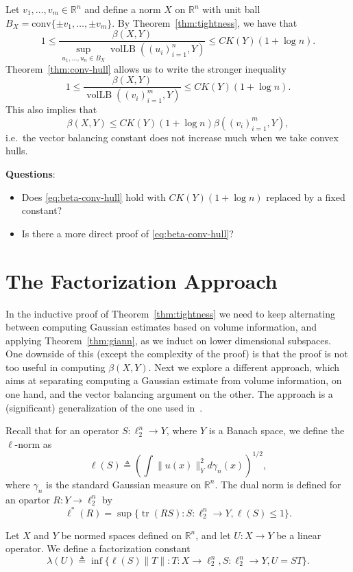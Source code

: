 \documentclass{article}
\newcommand{\R}{{\mathbb{R}}}
\newcommand{\eqdef}{\triangleq}
\DeclareMathOperator{\vollb}{volLB}
\DeclareMathOperator{\tr}{tr}
\begin{document}
Let $v_1, \ldots, v_m \in \R^n$ and define a norm $X$ on $\R^n$ with
unit ball $B_X = \mathrm{conv}\{\pm v_1, \ldots, \pm v_m\}$. By
Theorem~\ref{thm:tightness}, we have that 
\[
1 \le \frac{\beta(X, Y)}{\sup_{u_1, \ldots, u_n \in
    B_X}\vollb((u_i)_{i = 1}^n, Y)} \le C K(Y)(1+\log n).
\]
Theorem~\ref{thm:conv-hull} allows us to write the stronger inequality
\[
1 \le \frac{\beta(X, Y)}{\vollb((v_i)_{i = 1}^m, Y)} \le C K(Y)(1+\log n).
\]
This also implies that
\begin{equation}\label{eq:beta-conv-hull}
\beta(X, Y) \le CK(Y)(1+\log n) \beta((v_i)_{i = 1}^m, Y),
\end{equation}
i.e.~the vector balancing constant does not increase much when we take
convex hulls. 

\medskip\noindent
\textbf{Questions}:
\begin{itemize}
\item Does \eqref{eq:beta-conv-hull} hold with $CK(Y)(1+\log n)$
  replaced by a fixed constant?
\item Is there a more direct proof of \eqref{eq:beta-conv-hull}?
\end{itemize}

\section{The Factorization Approach}

In the inductive proof of Theorem~\ref{thm:tightness} we need to keep
alternating between computing Gaussian estimates based on volume
information, and applying Theorem~\ref{thm:giann}, as we induct on
lower dimensional subspaces. One downside of this (except the
complexity of the proof) is that the proof is not too useful in
computing $\beta(X, Y)$. Next we explore a different approach, which
aims at separating computing a Gaussian estimate from volume
information, on one hand, and the vector balancing argument on the
other. The approach is a (significant) generalization of the one used
in~\cite{disc-gamma2}. 

Recall that for an operator $S:\ell_2^n \to Y$, where $Y$ is a Banach
space, we define the $\ell$-norm as
\[
\ell(S) \eqdef \left( \int \|u(x)\|_Y^2 d\gamma_n(x) \right)^{1/2},
\]
where $\gamma_n$ is the standard Gaussian measure on $\R^n$. The dual
norm is defined for an opartor $R: Y \to \ell_2^n$ by 
\[
\ell^*(R) = \sup\{\tr(RS): S: \ell_2^n \to Y, \ell(S) \le 1\}.
\]

Let $X$ and $Y$ be normed spaces defined on $\R^n$, and let $U:X \to
Y$ be a linear operator. We define a factorization constant
\[
\lambda(U) \eqdef \inf \{\ell(S)\|T\|: T: X \to \ell_2^n, S: \ell_2^n
\to Y, U = ST\}.
\]
\end{document}
